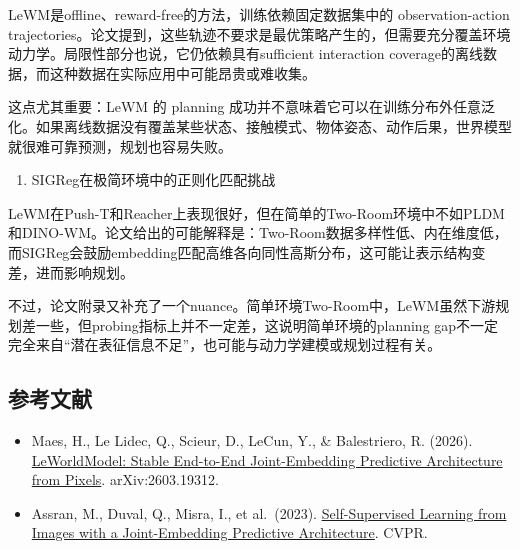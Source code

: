 LeWM是offline、reward-free的方法，训练依赖固定数据集中的 observation-action trajectories。论文提到，这些轨迹不要求是最优策略产生的，但需要充分覆盖环境动力学。局限性部分也说，它仍依赖具有sufficient interaction coverage的离线数据，而这种数据在实际应用中可能昂贵或难收集。

这点尤其重要：LeWM 的 planning 成功并不意味着它可以在训练分布外任意泛化。如果离线数据没有覆盖某些状态、接触模式、物体姿态、动作后果，世界模型就很难可靠预测，规划也容易失败。

\begin{enumerate}
\def\labelenumi{\arabic{enumi}.}
\setcounter{enumi}{4}
\tightlist
\item
  SIGReg在极简环境中的正则化匹配挑战
\end{enumerate}

LeWM在Push-T和Reacher上表现很好，但在简单的Two-Room环境中不如PLDM和DINO-WM。论文给出的可能解释是：Two-Room数据多样性低、内在维度低，而SIGReg会鼓励embedding匹配高维各向同性高斯分布，这可能让表示结构变差，进而影响规划。

不过，论文附录又补充了一个nuance。简单环境Two-Room中，LeWM虽然下游规划差一些，但probing指标上并不一定差，这说明简单环境的planning gap不一定完全来自``潜在表征信息不足''，也可能与动力学建模或规划过程有关。

\hypertarget{ux53c2ux8003ux6587ux732e-195}{%
\subsection{参考文献}\label{ux53c2ux8003ux6587ux732e-195}}

\begin{itemize}
\tightlist
\item
  Maes, H., Le Lidec, Q., Scieur, D., LeCun, Y., \& Balestriero, R. (2026). \href{https://arxiv.org/abs/2603.19312}{LeWorldModel: Stable End-to-End Joint-Embedding Predictive Architecture from Pixels}. arXiv:2603.19312.
\item
  Assran, M., Duval, Q., Misra, I., et al.~(2023). \href{https://arxiv.org/abs/2301.08243}{Self-Supervised Learning from Images with a Joint-Embedding Predictive Architecture}. CVPR.
\end{itemize}

\clearpage
